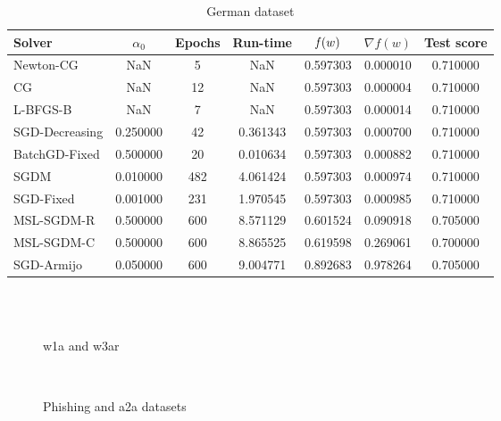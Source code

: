 \begin{table}
\caption{German dataset}
\label{tab:german-tab}
\centering
\begin{tabular}{lS[round-precision=3]S[drop-zero-decimal]S[round-precision=4]S[round-precision=6]S[exponent-mode=scientific]S[round-precision=6]}
\toprule
Solver & {$\alpha_0$} & {Epochs} & {Run-time} & {$\operatorname*{\mathit{f}}(w)$} & {$\nabla f(w)$} & {Test score} \\
\midrule
Newton-CG & NaN & 5 & NaN & 0.597303 & 0.000010 & 0.710000 \\
CG & NaN & 12 & NaN & 0.597303 & 0.000004 & 0.710000 \\
L-BFGS-B & NaN & 7 & NaN & 0.597303 & 0.000014 & 0.710000 \\
SGD-Decreasing & 0.250000 & 42 & 0.361343 & 0.597303 & 0.000700 & 0.710000 \\
BatchGD-Fixed & 0.500000 & 20 & 0.010634 & 0.597303 & 0.000882 & 0.710000 \\
SGDM & 0.010000 & 482 & 4.061424 & 0.597303 & 0.000974 & 0.710000 \\
SGD-Fixed & 0.001000 & 231 & 1.970545 & 0.597303 & 0.000985 & 0.710000 \\
MSL-SGDM-R & 0.500000 & 600 & 8.571129 & 0.601524 & 0.090918 & 0.705000 \\
MSL-SGDM-C & 0.500000 & 600 & 8.865525 & 0.619598 & 0.269061 & 0.700000 \\
SGD-Armijo & 0.050000 & 600 & 9.004771 & 0.892683 & 0.978264 & 0.705000 \\
\bottomrule
\end{tabular}
\end{table}

\begin{figure}
\centering
 \\
 \\
\caption[]{w1a and w3ar}
\label{fig:diab-breast}
\end{figure}

\begin{figure}
\centering
 \\
\caption[]{Phishing and a2a datasets}
\label{fig:phish-austr}
\end{figure}

